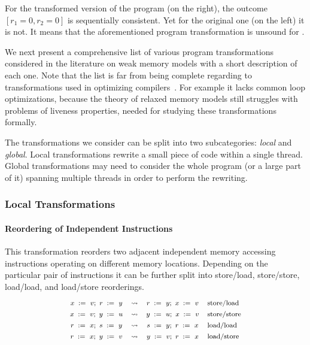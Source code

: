 For the transformed version of the program (on the right),
the outcome $[r_1=0, r_2=0]$ is sequentially consistent.
Yet for the original one (on the left) it is not. 
It means that the aforementioned program transformation
is unsound for \SC. 

We next present a comprehensive list of 
various program transformations considered in
the literature on weak memory models 
with a short description of each one.
Note that the list is far from being complete regarding to  
transformations used in optimizing compilers~\cite{Muchnick:ACDI97}.
For example it lacks common loop optimizations, 
because the theory of relaxed memory models still
struggles with problems of liveness properties, 
needed for studying these transformations formally. 

The transformations we consider can be split into 
two subcategories: \emph{local} and \emph{global}.
Local transformations rewrite a small 
piece of code within a single thread.
Global transformations may need to consider 
the whole program (or a large part of it) 
spanning multiple threads in order 
to perform the rewriting.       
 
\subsubsection{Local Transformations}

\paragraph{Reordering of Independent Instructions} 

This transformation reorders two 
adjacent independent memory accessing instructions
operating on different memory locations.
Depending on the particular pair of instructions
it can be further split into store/load, store/store, 
load/load, and load/store reorderings.  
%
\[\def\arraystretch{1.4}\footnotesize
  \begin{array}{cccl} 

      \writeInst{}{x}{v} \seq \readInst{}{r}{y} 
    & \leadsto 
    & \readInst{}{r}{y} \seq \writeInst{}{x}{v}
    & \text{store/load}  \\ 

      \writeInst{}{x}{v} \seq \writeInst{}{y}{u} 
    & \leadsto 
    & \writeInst{}{y}{u} \seq \writeInst{}{x}{v}
    & \text{store/store}  \\ 

      \readInst{}{r}{x} \seq \readInst{}{s}{y} 
    & \leadsto 
    & \readInst{}{s}{y} \seq \readInst{}{r}{x}
    & \text{load/load}  \\ 

      \readInst{}{r}{x} \seq \writeInst{}{y}{v} 
    & \leadsto 
    & \writeInst{}{y}{v} \seq \readInst{}{r}{x}
    & \text{load/store}  \\ 

  \end{array}
\]

